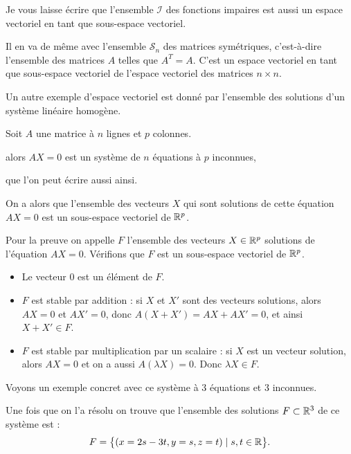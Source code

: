   \change
  
  Je vous laisse écrire que l'ensemble $\mathcal{I}$ des fonctions impaires est aussi un espace vectoriel en tant 
  que sous-espace vectoriel.
  
  \change
  
  Il en va de même avec l'ensemble $\mathcal{S}_n$ des matrices symétriques, c'est-à-dire l'ensemble des matrices $A$
  telles que $A^T=A$. C'est un espace vectoriel en tant que sous-espace vectoriel de l'espace vectoriel des matrices $n \times n$.
  
\diapo

Un autre exemple d'espace vectoriel est donné par l'ensemble des solutions d'un système 
linéaire homogène. 

Soit $A$ une matrice à $n$ lignes et $p$ colonnes.

alors $AX = 0$ est un système de $n$ équations à $p$ inconnues,

que l'on peut écrire aussi ainsi.


\change

On a alors que l'ensemble des vecteurs $X$ qui sont solutions de cette équation $AX=0$
est un sous-espace vectoriel de $\mathbb{R}^p$.

\change

Pour la preuve on appelle $F$ l'ensemble des vecteurs $X \in \mathbb{R}^p$ solutions de l'équation $AX=0$. 
Vérifions que $F$ est un sous-espace vectoriel de $\mathbb{R}^p$.
\begin{itemize}
  \item Le vecteur $0$ est un élément de $F$.
  \item $F$ est stable par addition : si $X$ et $X'$ sont des vecteurs solutions, 
  alors $AX = 0$ et $AX' = 0$, donc $A(X + X') = AX + AX' = 0$, et ainsi $X+X'\in F$.
  \item  $F$ est stable par multiplication par un scalaire : si $X$ est un vecteur solution,
  alors $AX = 0$ et on a aussi $A (\lambda X)  = 0$.
  Donc $\lambda X \in F$.
\end{itemize}



\diapo

Voyons un exemple concret avec ce système à 3 équations et 3 inconnues.

\change

Une fois que on l'a résolu on trouve que l'ensemble des solutions $F \subset \mathbb{R}^3$ de ce système est :
$$F = \big\{ (x =  2s - 3t, y  =  s, z  =  t) \mid s,t \in \mathbb{R} \big\}.$$


